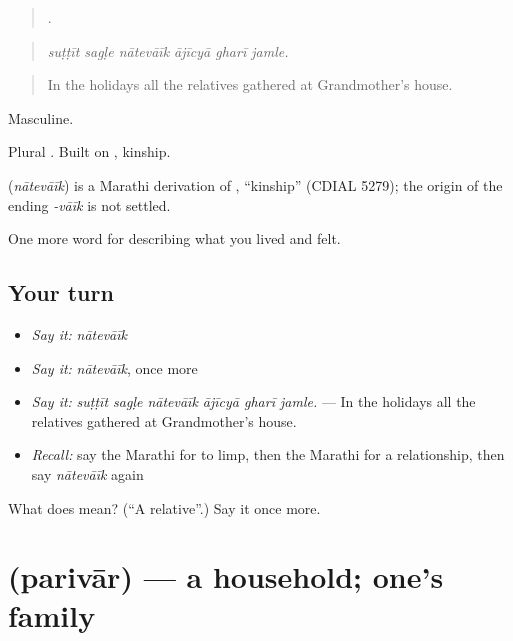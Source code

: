\begin{quote}
     .
\end{quote}

\begin{quote}
\emph{suṭṭīt sagḷe nātevāīk ājīcyā gharī jamle.}
\end{quote}

\begin{quote}
In the holidays all the relatives gathered at Grandmother's house.
\end{quote}

Masculine.

Plural . Built on , kinship.

\begin{cousinweb}
\textbf{} (\emph{nātevāīk}) is a Marathi derivation of , \textquotedblleft{}kinship\textquotedblright{} (CDIAL 5279); the origin of the ending \emph{-vāīk} is not settled.
\end{cousinweb}

\begin{grammarlens}[title={What you've built}]
One more word for describing what you lived and felt.
\end{grammarlens}

\subsection*{Your turn}
\begin{itemize}
\raggedright
  \item \emph{Say it:} \emph{nātevāīk}
  \item \emph{Say it:} \emph{nātevāīk}, once more
  \item \emph{Say it:} \emph{suṭṭīt sagḷe nātevāīk ājīcyā gharī jamle.} — In the holidays all the relatives gathered at Grandmother's house.
  \item \emph{Recall:} say the Marathi for to limp, then the Marathi for a relationship, then say \emph{nātevāīk} again
\end{itemize}

\begin{tcolorbox}[breakable,colback=teal!4,colframe=teal!35!black,title={Before you move on}]
What does  mean? (\textquotedblleft{}A relative\textquotedblright{}.) Say it once more.
\end{tcolorbox}
\section[\texorpdfstring{\mr{परिवार} (parivār)}{परिवार (parivār)}]{ (parivār) — a household; one's family}

